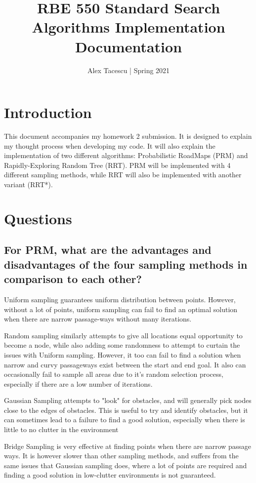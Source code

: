 \documentclass[journal]{IEEEtran}
\title{RBE 550 Standard Search Algorithms Implementation Documentation}
\author{Alex Tacescu | Spring 2021
}
\begin{document}
    \maketitle

    \section{Introduction}
    This document accompanies my homework 2 submission. It is designed to explain my thought process when developing my code. It will also explain the implementation of two different algorithms: Probabilistic RoadMaps (PRM) and Rapidly-Exploring Random Tree (RRT). PRM will be implemented with 4 different sampling methods, while RRT will also be implemented with another variant (RRT*).

    \section{Questions}
    \subsection{For PRM, what are the advantages and disadvantages of the four sampling methods in comparison to each other?}

    Uniform sampling guarantees uniform distribution between points. However, without a lot of points, uniform sampling can fail to find an optimal solution when there are narrow passage-ways without many iterations.

    Random sampling similarly attempts to give all locations equal opportunity to become a node, while also adding some randomness to attempt to curtain the issues with Uniform sampling. However, it too can fail to find a solution when narrow and curvy passageways exist between the start and end goal. It also can occasionally fail to sample all areas due to it's random selection process, especially if there are a low number of iterations.

    Gaussian Sampling attempts to "look" for obstacles, and will generally pick nodes close to the edges of obstacles. This is useful to try and identify obstacles, but it can sometimes lead to a failure to find a good solution, especially when there is little to no clutter in the environment

    Bridge Sampling is very effective at finding points when there are narrow passage ways. It is however slower than other sampling methods, and suffers from the same issues that Gaussian sampling does, where a lot of points are required and finding a good solution in low-clutter environments is not guaranteed.
\end{document}
